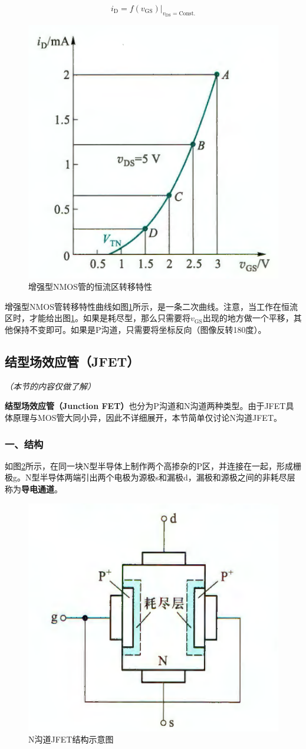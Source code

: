 \begin{equation}
    i_\mathrm{D}=f(v_{\mathrm{GS}})|_{v_{\mathrm{DS}}=\mathrm{Const.}}
\end{equation}

\begin{figure}[htb]
    \centering
    \includegraphics[width=0.35\linewidth]{pic/增强型NMOS管的恒流区转移特性.png}
    \caption{增强型NMOS管的恒流区转移特性\cite{康华光}\label{增强型NMOS管的恒流区转移特性}}
\end{figure}

增强型NMOS管转移特性曲线如图\ref{增强型NMOS管的恒流区转移特性}所示，是一条二次曲线。注意，当工作在恒流区时，才能给出图\ref{增强型NMOS管的恒流区转移特性}。如果是耗尽型，那么只需要将$v_{\mathrm{GS}}$出现的地方做⼀个平移，其他保持不变即可。如果是P沟道，只需要将坐标反向（图像反转180度）。

\subsection{结型场效应管（JFET）}
\textit{（本节的内容仅做了解）}

\textbf{结型场效应管（Junction FET）}也分为P沟道和N沟道两种类型。由于JFET具体原理与MOS管大同小异，因此不详细展开，本节简单仅讨论N沟道JFET。

\subsubsection{一、结构}
如图\ref{N沟道JFET结构示意图}所示，在同一块N型半导体上制作两个高掺杂的P区，并连接在一起，形成栅极g。N型半导体两端引出两个电极为源极s和漏极d，漏极和源极之间的非耗尽层称为\textbf{导电通道}。

\begin{figure}[htb]
    \centering
    \includegraphics[width=0.35\linewidth]{pic/N沟道JFET结构示意图.png}
    \caption{N沟道JFET结构示意图\cite{康华光}\label{N沟道JFET结构示意图}}
\end{figure}


